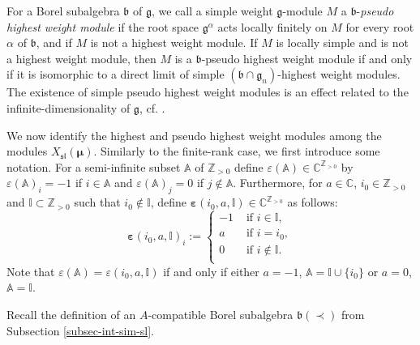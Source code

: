\documentclass[12pt]{amsart}
\newcommand{\C}{{\mathbb C}}
\newcommand{\Z}{{\mathbb Z}}
\def\gb{\mathfrak{b}}
\def\gg{\mathfrak{g}}
\def\Z{\mathbb{Z}}
\begin{document}
For a Borel subalgebra $\gb$ of $\gg$, we call a simple weight  $\gg$-module $M$ a $\gb$-\emph{pseudo highest weight module} if the root space $\gg^\alpha$ acts locally finitely on $M$ for every root $\alpha$ of $\gb$, and if $M$ is not a highest weight module. If $M$ is locally simple and is not a highest weight module, then $M$ is a $\gb$-pseudo highest weight module if and only if it is isomorphic to a direct limit of simple $(\gb \cap \gg_n)$-highest weight modules. The existence of simple pseudo highest weight modules is an effect related to the infinite-dimensionality of $\gg$, cf. \cite{DP}.


We now identify the highest and pseudo highest weight modules among the modules $X_{\mathfrak{sl}}(\boldsymbol{\mu})$.  Similarly to the finite-rank case, we first introduce some notation.  For a semi-infinite subset ${\mathbb A}$ of $\Z_{>0}$ define $\varepsilon ({\mathbb A})\in {\mathbb C}^{{\mathbb Z}_{>0}}$ by $\varepsilon ({\mathbb A})_i = -1$ if $i \in {\mathbb A}$ and $\varepsilon  ({\mathbb A})_j = 0$ if $j \notin {\mathbb A}$. Furthermore, for $a \in {\mathbb C}$, $i_0 \in {\mathbb Z}_{>0}$ and $\mathbb I \subset {\mathbb Z}_{>0}$ such that $i_0 \notin \mathbb I$, define $\boldsymbol{\varepsilon} (i_0, a, \mathbb I) \in \C^{\Z_{>0}}$ as follows: 
$$
\boldsymbol{\varepsilon} (i_0, a, \mathbb  I)_{i} := \begin{cases}
-1 & \mbox{ if } i \in \mathbb I, \\  
a & \mbox{ if } i = i_0, \\  
0 & \mbox{ if } i \notin \mathbb I. \\  
\end{cases} 
 $$
Note that $\varepsilon ({\mathbb A}) = \varepsilon (i_0,a,\mathbb I)$ if and only if either $a=-1$, ${\mathbb A} = {\mathbb I} \cup \{ i_0\}$ or $a=0$, ${\mathbb A} = \mathbb I$. 
 
 Recall the definition of an $A$-compatible Borel subalgebra $\gb(\prec)$ from Subsection \ref{subsec-int-sim-sl}.
 
\end{document}
